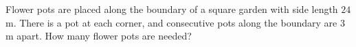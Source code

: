 Flower pots are placed along the boundary of a square garden with side length $24$ m. There is a pot at each corner, and consecutive pots along the boundary are $3$ m apart. How many flower pots are needed?
